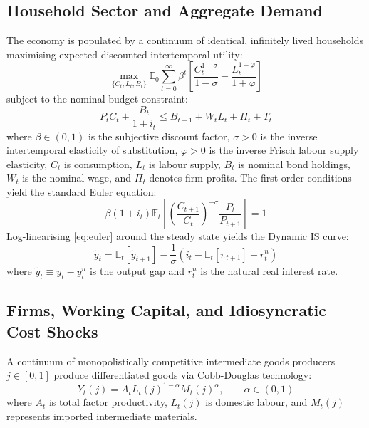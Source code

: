 \documentclass[review,12pt]{elsarticle}
\begin{document}
\subsection{Household Sector and Aggregate Demand}

The economy is populated by a continuum of identical, infinitely lived households
maximising expected discounted intertemporal utility:
\begin{equation}
\max_{\{C_t,L_t,B_t\}} \mathbb{E}_0 \sum_{t=0}^{\infty} \beta^t
\left[\frac{C_t^{1-\sigma}}{1-\sigma} - \frac{L_t^{1+\varphi}}{1+\varphi}\right]
\label{eq:utility}
\end{equation}
subject to the nominal budget constraint:
\begin{equation}
P_t C_t + \frac{B_t}{1+i_t} \le B_{t-1} + W_t L_t + \Pi_t + T_t
\label{eq:budget}
\end{equation}
where $\beta \in (0,1)$ is the subjective discount factor, $\sigma > 0$ is the
inverse intertemporal elasticity of substitution, $\varphi > 0$ is the inverse
Frisch labour supply elasticity, $C_t$ is consumption, $L_t$ is labour supply,
$B_t$ is nominal bond holdings, $W_t$ is the nominal wage, and $\Pi_t$ denotes
firm profits. The first-order conditions yield the standard Euler equation:
\begin{equation}
\beta (1+i_t) \mathbb{E}_t \left[\left(\frac{C_{t+1}}{C_t}\right)^{-\sigma} \frac{P_t}{P_{t+1}}\right] = 1
\label{eq:euler}
\end{equation}
Log-linearising \eqref{eq:euler} around the steady state yields the Dynamic IS curve:
\begin{equation}
\tilde{y}_t = \mathbb{E}_t[\tilde{y}_{t+1}] - \frac{1}{\sigma}(i_t - \mathbb{E}_t[\pi_{t+1}] - r_t^n)
\label{eq:is}
\end{equation}
where $\tilde{y}_t \equiv y_t - y_t^n$ is the output gap and $r_t^n$ is the natural real interest rate.

\subsection{Firms, Working Capital, and Idiosyncratic Cost Shocks}
\label{sec:firm}

A continuum of monopolistically competitive intermediate goods producers $j \in [0,1]$
produce differentiated goods via Cobb-Douglas technology:
\begin{equation}
Y_t(j) = A_t L_t(j)^{1-\alpha} M_t(j)^{\alpha}, \qquad \alpha \in (0,1)
\label{eq:prod}
\end{equation}
where $A_t$ is total factor productivity, $L_t(j)$ is domestic labour, and $M_t(j)$
represents imported intermediate materials.
\end{document}
